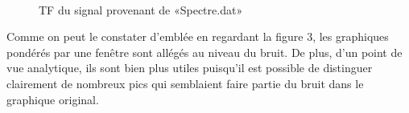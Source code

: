 \documentclass[11pt]{article}
\begin{document}
\begin{figure}[ht!]
  \centering
  \\
  \caption{TF du signal provenant de «Spectre.dat»}
\end{figure}

Comme on peut le constater d'emblée en regardant la figure 3, les graphiques pondérés par une fenêtre sont allégés au niveau du bruit. De plus, d'un point de vue analytique, ils sont bien plus utiles puisqu'il est possible de distinguer clairement de nombreux pics qui semblaient faire partie du bruit dans le graphique original.
\end{document}
